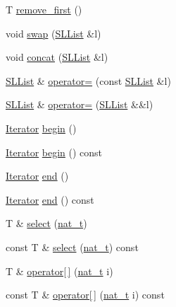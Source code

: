 \begin{DoxyCompactItemize}
\item 
T \hyperlink{class_designar_1_1_s_l_list_aedf1d4b4e8134748796a56e7d4ac9d11}{remove\+\_\+first} ()
\item 
void \hyperlink{class_designar_1_1_s_l_list_a21c2c6233d40927d715827cf693b4694}{swap} (\hyperlink{class_designar_1_1_s_l_list}{S\+L\+List} \&l)
\item 
void \hyperlink{class_designar_1_1_s_l_list_aad5a17e1fe22c311f3c645e074c7f496}{concat} (\hyperlink{class_designar_1_1_s_l_list}{S\+L\+List} \&l)
\item 
\hyperlink{class_designar_1_1_s_l_list}{S\+L\+List} \& \hyperlink{class_designar_1_1_s_l_list_a2f641e22e546f78db4568d7f6a7b5657}{operator=} (const \hyperlink{class_designar_1_1_s_l_list}{S\+L\+List} \&l)
\item 
\hyperlink{class_designar_1_1_s_l_list}{S\+L\+List} \& \hyperlink{class_designar_1_1_s_l_list_a24aa3685762f736e0d095c149d666e6c}{operator=} (\hyperlink{class_designar_1_1_s_l_list}{S\+L\+List} \&\&l)
\item 
\hyperlink{class_designar_1_1_s_l_list_1_1_iterator}{Iterator} \hyperlink{class_designar_1_1_s_l_list_aaff598b2f723981c65c5b17830537994}{begin} ()
\item 
\hyperlink{class_designar_1_1_s_l_list_1_1_iterator}{Iterator} \hyperlink{class_designar_1_1_s_l_list_ada42ce0576fda045f39e09d7a6846586}{begin} () const
\item 
\hyperlink{class_designar_1_1_s_l_list_1_1_iterator}{Iterator} \hyperlink{class_designar_1_1_s_l_list_a1fc18a918d23fd61767c2bf2f10f25b6}{end} ()
\item 
\hyperlink{class_designar_1_1_s_l_list_1_1_iterator}{Iterator} \hyperlink{class_designar_1_1_s_l_list_abeb2f9568d658b5da8831e7d993de353}{end} () const
\item 
T \& \hyperlink{class_designar_1_1_s_l_list_a5f9a0e22a762f23ab48db2e4d59d1a38}{select} (\hyperlink{namespace_designar_aa72662848b9f4815e7bf31a7cf3e33d1}{nat\+\_\+t})
\item 
const T \& \hyperlink{class_designar_1_1_s_l_list_abb09e0413e57c81d7605c79464808ee0}{select} (\hyperlink{namespace_designar_aa72662848b9f4815e7bf31a7cf3e33d1}{nat\+\_\+t}) const
\item 
T \& \hyperlink{class_designar_1_1_s_l_list_aefb432c3282c688254aba416f8332e0e}{operator\mbox{[}$\,$\mbox{]}} (\hyperlink{namespace_designar_aa72662848b9f4815e7bf31a7cf3e33d1}{nat\+\_\+t} i)
\item 
const T \& \hyperlink{class_designar_1_1_s_l_list_a55c46ef03039c63bb9e62d8266d92381}{operator\mbox{[}$\,$\mbox{]}} (\hyperlink{namespace_designar_aa72662848b9f4815e7bf31a7cf3e33d1}{nat\+\_\+t} i) const
\end{DoxyCompactItemize}


